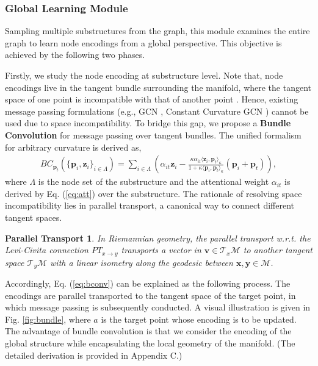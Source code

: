 \subsubsection{\textbf{Global Learning Module}}
Sampling multiple substructures from the graph, this module examines the entire graph to learn node encodings from a global perspective.
This objective is achieved by the following two phases.

Firstly, we study the node encoding at substructure level.
Note that, 
node encodings live in the tangent bundle surrounding the manifold, where the tangent space of one point is incompatible with that of another point \cite{Petersen16}.
Hence, existing message passing formulations (e.g., GCN \cite{iclr17gcn}, Constant Curvature GCN \cite{icml20Constant}) cannot be used due to space incompatibility.
To bridge this gap, we propose a \textbf{Bundle Convolution} for  message passing over tangent bundles.
The unified formalism for arbitrary curvature is derived as,
\begin{align}
BC_{\boldsymbol p_t}(\{\boldsymbol p_i, \boldsymbol z_i\}_{i\in\Lambda})=\sum\limits_{i\in\Lambda}\left(\alpha_{it} \boldsymbol z_i-\frac{\kappa\alpha_{it}\langle\boldsymbol z_i, \boldsymbol p_t\rangle_\kappa}{1+\kappa\langle\boldsymbol p_i, \boldsymbol p_t\rangle_\kappa}(\boldsymbol p_i+\boldsymbol p_t)\right),
\label{eq:bconv}
\end{align}
where $\Lambda$ is the node set of the substructure and the attentional weight $\alpha_{it}$ is derived by Eq. (\ref{eq:att}) over the substructure.
The rationale of resolving space incompatibility lies in parallel transport, a canonical way to connect different tangent spaces.
\begin{mymath}
\newtheorem*{def2}{Parallel Transport} 
\begin{def2}
In Riemannian geometry, the parallel transport w.r.t. the Levi-Civita connection $PT_{x\to y}$ transports a vector in $\boldsymbol v \in \mathcal T_x\mathcal M$ to another tangent space $\mathcal T_y\mathcal M$ with a linear isometry along the geodesic between $\boldsymbol x, \boldsymbol y \in \mathcal M$.
\end{def2}
\end{mymath}
\vspace{-0.05in}
\noindent Accordingly,  Eq. (\ref{eq:bconv}) can be explained as the following process. 
The encodings are parallel transported to the tangent space of the target point, in which message passing is subsequently conducted. 
A visual illustration is given in Fig. \ref{fig:bundle}, where $a$ is the target point whose encoding is to be updated. 
The advantage of bundle convolution is that we consider the encoding of the global structure while encapsulating the local geometry of the manifold.
(The detailed derivation is provided  in Appendix C.)


